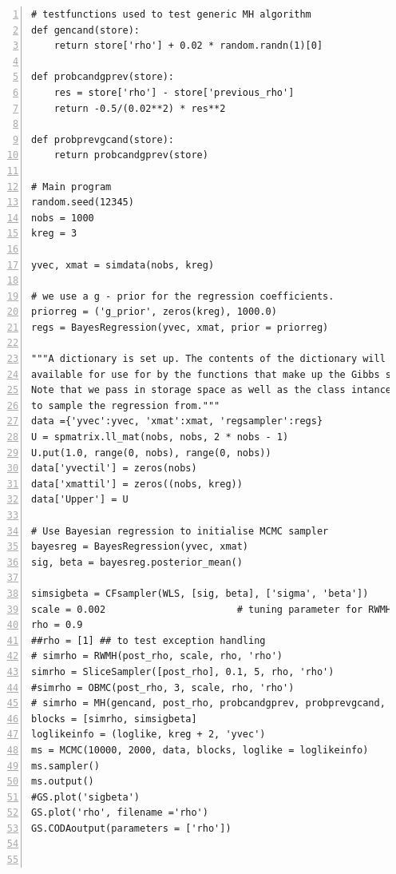 \documentclass[article]{jss}
\begin{document}
\begin{lstlisting}[basicstyle={\scriptsize},numbers=left,tabsize=4]
# testfunctions used to test generic MH algorithm
def gencand(store):
    return store['rho'] + 0.02 * random.randn(1)[0]

def probcandgprev(store):
    res = store['rho'] - store['previous_rho']
    return -0.5/(0.02**2) * res**2

def probprevgcand(store):
    return probcandgprev(store)

# Main program
random.seed(12345)
nobs = 1000
kreg = 3

yvec, xmat = simdata(nobs, kreg)

# we use a g - prior for the regression coefficients.
priorreg = ('g_prior', zeros(kreg), 1000.0)
regs = BayesRegression(yvec, xmat, prior = priorreg)

"""A dictionary is set up. The contents of the dictionary will be
available for use for by the functions that make up the Gibbs sampler.
Note that we pass in storage space as well as the class intance used
to sample the regression from."""
data ={'yvec':yvec, 'xmat':xmat, 'regsampler':regs}
U = spmatrix.ll_mat(nobs, nobs, 2 * nobs - 1)
U.put(1.0, range(0, nobs), range(0, nobs))
data['yvectil'] = zeros(nobs)
data['xmattil'] = zeros((nobs, kreg))
data['Upper'] = U

# Use Bayesian regression to initialise MCMC sampler
bayesreg = BayesRegression(yvec, xmat)
sig, beta = bayesreg.posterior_mean()

simsigbeta = CFsampler(WLS, [sig, beta], ['sigma', 'beta'])
scale = 0.002                       # tuning parameter for RWMH
rho = 0.9
##rho = [1] ## to test exception handling
# simrho = RWMH(post_rho, scale, rho, 'rho')
simrho = SliceSampler([post_rho], 0.1, 5, rho, 'rho')
#simrho = OBMC(post_rho, 3, scale, rho, 'rho')
# simrho = MH(gencand, post_rho, probcandgprev, probprevgcand, rho, 'rho')
blocks = [simrho, simsigbeta]
loglikeinfo = (loglike, kreg + 2, 'yvec')
ms = MCMC(10000, 2000, data, blocks, loglike = loglikeinfo)
ms.sampler()
ms.output()
#GS.plot('sigbeta')
GS.plot('rho', filename ='rho')
GS.CODAoutput(parameters = ['rho'])



\end{lstlisting}
\end{document}
